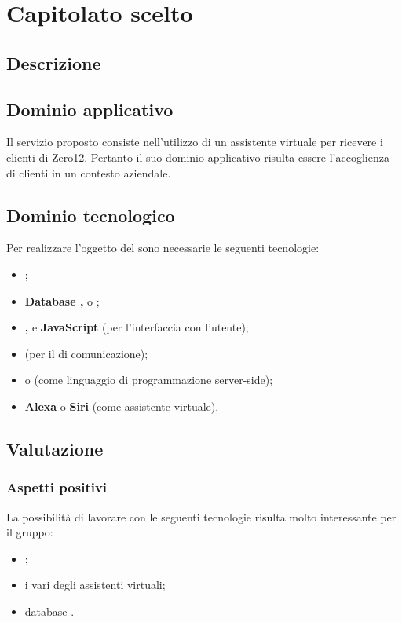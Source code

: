 \section {Capitolato scelto}
	\subsection {Descrizione}
		\SCOPO
	\subsection {Dominio applicativo}
Il servizio proposto consiste nell'utilizzo di un assistente virtuale per ricevere i clienti di Zero12. Pertanto il suo dominio applicativo risulta essere l'accoglienza di clienti in un contesto aziendale.
	\subsection {Dominio tecnologico}
		Per realizzare l'oggetto del  sono necessarie le seguenti tecnologie:
		\begin {itemize}
			\item \textbf{};
			\item \textbf{Database , } o \textbf{};
			\item \textbf{, } e \textbf{JavaScript} (per l'interfaccia con l'utente);
			\item \textbf{} (per il  di comunicazione);
			\item \textbf{} o \textbf{} (come linguaggio di programmazione
 server-side);
 			\item \textbf{ Alexa} o \textbf{Siri} (come assistente virtuale).

		\end {itemize}
	\subsection {Valutazione}
		\subsubsection {Aspetti positivi}
			 La possibilità di lavorare con le seguenti tecnologie risulta molto interessante per il gruppo:
				 \begin {itemize}
				 	\item {};
				 	\item i vari  degli assistenti virtuali;
				 	\item database .
				 \end {itemize}
